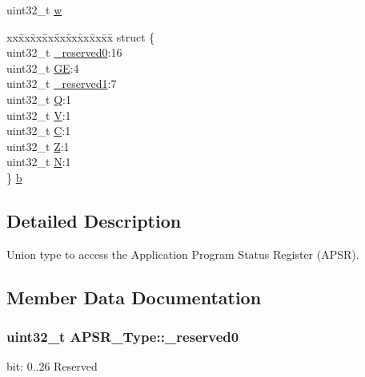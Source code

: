 \begin{DoxyCompactItemize}
\begin{tabbing}
\end{tabbing}\item 
uint32\-\_\-t \hyperlink{union_a_p_s_r___type_ae4c2ef8c9430d7b7bef5cbfbbaed3a94}{w}
\item 
\begin{tabbing}
xx\=xx\=xx\=xx\=xx\=xx\=xx\=xx\=xx\=\kill
struct \{\\
\>uint32\_t \hyperlink{union_a_p_s_r___type_afbce95646fd514c10aa85ec0a33db728}{\_reserved0}:16\\
\>uint32\_t \hyperlink{union_a_p_s_r___type_adcb98a5b9c93b0cb69cdb7af5638f32e}{GE}:4\\
\>uint32\_t \hyperlink{union_a_p_s_r___type_ac681f266e20b3b3591b961e13633ae13}{\_reserved1}:7\\
\>uint32\_t \hyperlink{union_a_p_s_r___type_a22d10913489d24ab08bd83457daa88de}{Q}:1\\
\>uint32\_t \hyperlink{union_a_p_s_r___type_a8004d224aacb78ca37774c35f9156e7e}{V}:1\\
\>uint32\_t \hyperlink{union_a_p_s_r___type_a86e2c5b891ecef1ab55b1edac0da79a6}{C}:1\\
\>uint32\_t \hyperlink{union_a_p_s_r___type_a3b04d58738b66a28ff13f23d8b0ba7e5}{Z}:1\\
\>uint32\_t \hyperlink{union_a_p_s_r___type_a7e7bbba9b00b0bb3283dc07f1abe37e0}{N}:1\\
\} \hyperlink{union_a_p_s_r___type_a250681ece58cf12233f316edea344e75}{b}\\

\end{tabbing}\end{DoxyCompactItemize}


\subsection{Detailed Description}
Union type to access the Application Program Status Register (A\-P\-S\-R). 

\subsection{Member Data Documentation}
\hypertarget{union_a_p_s_r___type_afbce95646fd514c10aa85ec0a33db728}{
\subsubsection[{\-\_\-reserved0}]{\setlength{\rightskip}{0pt plus 5cm}uint32\-\_\-t A\-P\-S\-R\-\_\-\-Type\-::\-\_\-reserved0}}\label{union_a_p_s_r___type_afbce95646fd514c10aa85ec0a33db728}
bit\-: 0..26 Reserved

